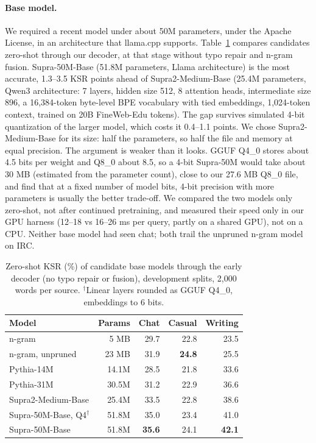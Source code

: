 \documentclass[11pt]{article}
\begin{document}
\paragraph{Base model.} We required a recent model under about 50M parameters, under the Apache License, in an
architecture that llama.cpp \citep{llamacpp} supports. Table~\ref{tab:zeroshot} compares candidates zero-shot
through our decoder, at that stage without typo repair and n-gram fusion. Supra-50M-Base (51.8M parameters, Llama
architecture) is the most accurate, 1.3--3.5 KSR points ahead of Supra2-Medium-Base (25.4M parameters, Qwen3
architecture: 7 layers, hidden size 512, 8 attention heads, intermediate size 896, a 16,384-token byte-level BPE
vocabulary with tied embeddings, 1,024-token context, trained on 20B FineWeb-Edu tokens). The gap survives simulated
4-bit quantization of the larger model, which costs it 0.4--1.1 points. We chose Supra2-Medium-Base for its size:
half the parameters, so half the file and memory at equal precision. The argument is weaker than it looks. GGUF
Q4\_0 stores about 4.5 bits per weight and Q8\_0 about 8.5, so a 4-bit Supra-50M would take about 30 MB (estimated
from the parameter count), close to our 27.6 MB Q8\_0 file, and \citet{dettmers-zettlemoyer-2023-case} find that at
a fixed number of model bits, 4-bit precision with more parameters is usually the better trade-off. We compared the
two models only zero-shot, not after continued pretraining, and measured their speed only in our GPU harness (12--18
vs 16--26 ms per query, partly on a shared GPU), not on a CPU. Neither base model had
seen chat; both trail the unpruned n-gram model on IRC.

\begin{table}[t]
\centering
\small
\setlength{\tabcolsep}{4pt}
\begin{tabular}{@{}lrrrr@{}}
\toprule
Model & Params & Chat & Casual & Writing \\
\midrule
n-gram & 5 MB & 29.7 & 22.8 & 23.5 \\
n-gram, unpruned & 23 MB & 31.9 & \textbf{24.8} & 25.5 \\
Pythia-14M & 14.1M & 28.5 & 21.8 & 33.6 \\
Pythia-31M & 30.5M & 31.2 & 22.9 & 36.6 \\
Supra2-Medium-Base & 25.4M & 33.5 & 22.8 & 38.6 \\
Supra-50M-Base, Q4$^\dagger$ & 51.8M & 35.0 & 23.4 & 41.0 \\
Supra-50M-Base & 51.8M & \textbf{35.6} & 24.1 & \textbf{42.1} \\
\bottomrule
\end{tabular}
\caption{Zero-shot KSR (\%) of candidate base models through the early decoder (no typo repair or fusion),
development splits, 2,000 words per source. $^\dagger$Linear layers rounded as GGUF Q4\_0, embeddings to 6 bits.}
\label{tab:zeroshot}
\end{table}
\end{document}
